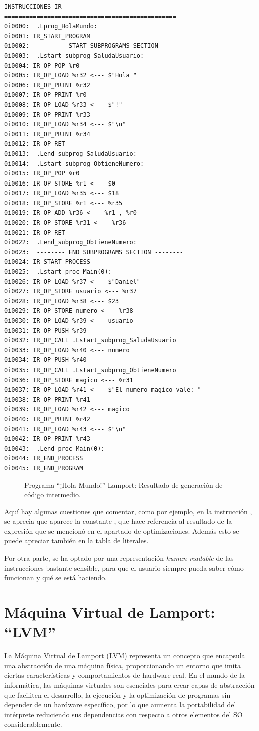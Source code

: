 \begin{verbatim}
INSTRUCCIONES IR
================================================
0i0000:  .Lprog_HolaMundo:
0i0001: IR_START_PROGRAM 
0i0002:  -------- START SUBPROGRAMS SECTION -------- 
0i0003:  .Lstart_subprog_SaludaUsuario:
0i0004: IR_OP_POP %r0
0i0005: IR_OP_LOAD %r32 <--- $"Hola "
0i0006: IR_OP_PRINT %r32
0i0007: IR_OP_PRINT %r0
0i0008: IR_OP_LOAD %r33 <--- $"!"
0i0009: IR_OP_PRINT %r33
0i0010: IR_OP_LOAD %r34 <--- $"\n"
0i0011: IR_OP_PRINT %r34
0i0012: IR_OP_RET 
0i0013:  .Lend_subprog_SaludaUsuario:
0i0014:  .Lstart_subprog_ObtieneNumero:
0i0015: IR_OP_POP %r0
0i0016: IR_OP_STORE %r1 <--- $0
0i0017: IR_OP_LOAD %r35 <--- $18
0i0018: IR_OP_STORE %r1 <--- %r35
0i0019: IR_OP_ADD %r36 <--- %r1 , %r0
0i0020: IR_OP_STORE %r31 <--- %r36
0i0021: IR_OP_RET 
0i0022:  .Lend_subprog_ObtieneNumero:
0i0023:  -------- END SUBPROGRAMS SECTION -------- 
0i0024: IR_START_PROCESS 
0i0025:  .Lstart_proc_Main(0):
0i0026: IR_OP_LOAD %r37 <--- $"Daniel"
0i0027: IR_OP_STORE usuario <--- %r37
0i0028: IR_OP_LOAD %r38 <--- $23
0i0029: IR_OP_STORE numero <--- %r38
0i0030: IR_OP_LOAD %r39 <--- usuario
0i0031: IR_OP_PUSH %r39
0i0032: IR_OP_CALL .Lstart_subprog_SaludaUsuario
0i0033: IR_OP_LOAD %r40 <--- numero
0i0034: IR_OP_PUSH %r40
0i0035: IR_OP_CALL .Lstart_subprog_ObtieneNumero
0i0036: IR_OP_STORE magico <--- %r31
0i0037: IR_OP_LOAD %r41 <--- $"El numero magico vale: "
0i0038: IR_OP_PRINT %r41
0i0039: IR_OP_LOAD %r42 <--- magico
0i0040: IR_OP_PRINT %r42
0i0041: IR_OP_LOAD %r43 <--- $"\n"
0i0042: IR_OP_PRINT %r43
0i0043:  .Lend_proc_Main(0):
0i0044: IR_END_PROCESS 
0i0045: IR_END_PROGRAM 
\end{verbatim}
\begin{figure}[hbtp]
\caption{Programa ``¡Hola Mundo!'' Lamport: Resultado de generación de código intermedio.}
\label{fig:IRHolaMundo}
\end{figure}

Aquí hay algunas cuestiones que comentar, como por ejemplo, en la instrucción , se aprecia que aparece la constante , que hace referencia al resultado de la expresión que se mencionó en el apartado de optimizaciones. Además esto se puede apreciar también en la tabla de literales. 

\vspace{0.5cm}
Por otra parte, se ha optado por una representación \textit{human readable} de las instrucciones bastante sensible, para que el usuario siempre pueda saber cómo funcionan y qué se está haciendo.

\section{Máquina Virtual de Lamport: ``LVM''}\label{sec:implementacionLVM}
La Máquina Virtual de Lamport (LVM) representa un concepto que encapsula una abstracción de una máquina física, proporcionando un entorno que imita ciertas características y comportamientos de hardware real. En el mundo de la informática, las máquinas virtuales son esenciales para crear capas de abstracción que faciliten el desarrollo, la ejecución y la optimización de programas sin depender de un hardware específico, por lo que aumenta la portabilidad del intérprete reduciendo sus dependencias con respecto a otros elementos del SO considerablemente.

